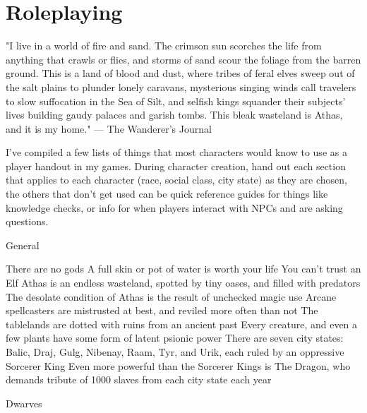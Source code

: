 \chapter{Roleplaying}\label{chap:roleplaying}
"I live in a world of fire and sand. The crimson sun scorches the life from anything that crawls or flies, and storms of sand scour the foliage from the barren ground. This is a land of blood and dust, where tribes of feral elves sweep out of the salt plains to plunder lonely caravans, mysterious singing winds call travelers to slow suffocation in the Sea of Silt, and selfish kings squander their subjects’ lives building gaudy palaces and garish tombs. This bleak wasteland is Athas, and it is my home." — The Wanderer’s Journal

I've compiled a few lists of things that most characters would know to use as a player handout in my games. During character creation, hand out each section that applies to each character (race, social class, city state) as they are chosen, the others that don't get used can be quick reference guides for things like knowledge checks, or info for when players interact with NPCs and are asking questions.

General

    There are no gods
    A full skin or pot of water is worth your life
    You can’t trust an Elf
    Athas is an endless wasteland, spotted by tiny oases, and filled with predators
    The desolate condition of Athas is the result of unchecked magic use
    Arcane spellcasters are mistrusted at best, and reviled more often than not
    The tablelands are dotted with ruins from an ancient past
    Every creature, and even a few plants have some form of latent psionic power
    There are seven city states: Balic, Draj, Gulg, Nibenay, Raam, Tyr, and Urik, each ruled by an oppressive Sorcerer King
    Even more powerful than the Sorcerer Kings is The Dragon, who demands tribute of 1000 slaves from each city state each year

Dwarves

